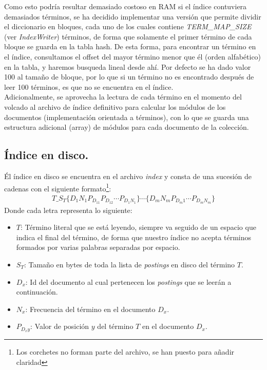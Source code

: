 \documentclass[spanish]{assignment}
\begin{document}
	Como esto podría resultar demasiado costoso en RAM si el índice contuviera demasiados términos, se ha decidido implementar una versión que permite dividir el diccionario en bloques, cada uno de los cuales contiene \textit{TERM\_MAP\_SIZE} (ver \textit{IndexWriter}) términos, de forma que solamente el primer término de cada bloque se guarda en la tabla hash. De esta forma, para encontrar un término en el índice, consultamos el offset del mayor término menor que él (orden alfabético) en la tabla, y haremos busqueda lineal desde ahí. Por defecto se ha dado valor 100 al tamaño de bloque, por lo que si un término no es encontrado después de leer 100 términos, es que no se encuentra en el índice.\\
	
	Adicionalmente, se aprovecha la lectura de cada término en el momento del volcado al archivo de índice definitivo para calcular los módulos de los documentos (implementación orientada a términos), con lo que se guarda una estructura adicional (array) de módulos para cada documento de la colección.
	
	\subsection{Índice en disco.}
	Él índice en disco se encuentra en el archivo \textit{index} y consta de una sucesión de cadenas con el siguiente formato\footnote{Los corchetes no forman parte del archivo, se han puesto para añadir claridad}:
	\begin{align*}
	T\_S_T\{D_1N_1P_{D_11}P_{D_12}\cdots P_{D_1N_1}\}\cdots \{D_mN_mP_{D_m1}\cdots P_{D_mN_m}\}
	\end{align*}
	Donde cada letra representa lo siguiente:
	\begin{itemize}
		\item$T$: Término literal que se está leyendo, siempre va seguido de un espacio que indica el final del término, de forma que nuestro índice no acepta términos formados por varias palabras separadas por espacio.
		\item$S_T$: Tamaño en bytes de toda la lista de \textit{postings} en disco del término $T$.
		\item$D_x$: Id del documento al cual pertenecen los \textit{postings} que se leerán a continuación.
		\item$N_x$: Frecuencia del término en el documento $D_x$.
		\item$P_{D_xy}$: Valor de posición $y$ del término $T$ en el documento $D_x$.
	\end{itemize}
	
\end{document}

